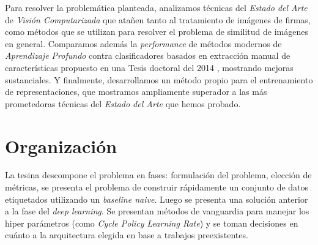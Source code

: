 Para resolver la problemática planteada, analizamos técnicas del \textit{Estado del Arte} de \textit{Visión Computarizada} que atañen tanto al tratamiento de imágenes de firmas, como métodos que se utilizan para resolver el problema de similitud de imágenes en general. Comparamos además la \textit{performance} de métodos modernos de \textit{Aprendizaje Profundo} contra clasificadores basados en extracción manual de características propuesto en una Tesis doctoral del 2014 \cite{tesis-parodi}, mostrando mejoras sustanciales. Y finalmente, desarrollamos un método propio para el entrenamiento de representaciones, que mostramos ampliamente superador a las más prometedoras técnicas del \textit{Estado del Arte} que hemos probado. \\

\section{Organización}

La tesina  descompone el problema en fases: formulación del problema, elección de métricas, se presenta el problema de construir rápidamente un conjunto de datos etiquetados utilizando un \textit{baseline naive}. Luego se presenta una solución anterior a la fase del \textit{deep learning}. Se presentan métodos de vanguardia para manejar los hiper parámetros (como \textit{Cycle Policy Learning Rate}) y se toman decisiones en cuánto a la arquitectura elegida en base a trabajos preexistentes. 

